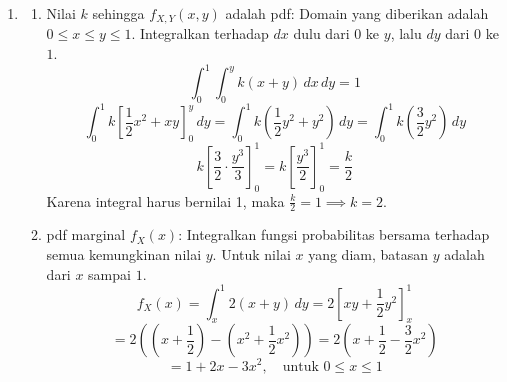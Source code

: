 \documentclass[12pt,a4paper]{article}
\begin{document}
\begin{enumerate}
\begin{enumerate}[label=(\alph*)]
          \item $P[X < Y < 2X]$:
                Batasan integrasi ditentukan oleh $y > x$ dan $y < 2x$ pada kotak $0 < x < 1$ dan $0 < y < 1$.
                Perpotongan garis $y = 2x$ dengan batas $y = 1$ berada di $x = 1/2$. Sehingga daerah ini dibagi dua:
                Untuk nilai elemen $x \in (0, 1/2]$, batas $y$ dari $x$ ke $2x$.
                Untuk nilai elemen $x \in (1/2, 1)$, batas $y$ dari $x$ ke $1$.
                \[ P = \int_{0}^{1/2} \int_{x}^{2x} \frac{2}{3}(x+1) \,dy \,dx + \int_{1/2}^{1} \int_{x}^{1} \frac{2}{3}(x+1) \,dy \,dx \]
                Bagian 1:
                \[ \int_{0}^{1/2} \frac{2}{3}(x+1) (2x - x) \,dx = \int_{0}^{1/2} \frac{2}{3}(x^2 + x) \,dx = \frac{2}{3} \left[ \frac{x^3}{3} + \frac{x^2}{2} \right]_0^{1/2} \]
                \[ = \frac{2}{3} \left( \frac{1/8}{3} + \frac{1/4}{2} \right) = \frac{2}{3} \left( \frac{1}{24} + \frac{1}{8} \right) = \frac{2}{3} \left( \frac{4}{24} \right) = \frac{1}{9} \]
                Bagian 2:
                \[ \int_{1/2}^{1} \frac{2}{3}(x+1) (1 - x) \,dx = \int_{1/2}^{1} \frac{2}{3}(1 - x^2) \,dx = \frac{2}{3} \left[ x - \frac{x^3}{3} \right]_{1/2}^{1} \]
                \[ = \frac{2}{3} \left( \left(1 - \frac{1}{3}\right) - \left(\frac{1}{2} - \frac{1}{24}\right) \right) = \frac{2}{3} \left( \frac{2}{3} - \frac{11}{24} \right) = \frac{2}{3} \left( \frac{5}{24} \right) = \frac{5}{36} \]
                Total probabilitas:
                \[ \frac{1}{9} + \frac{5}{36} = \frac{4}{36} + \frac{5}{36} = \frac{9}{36} = \frac{1}{4} \]
        \end{enumerate}

  \item
        \begin{enumerate}[label=(\alph*)]
          \item Nilai $k$ sehingga $f_{X,Y}(x,y)$ adalah pdf:
                Domain yang diberikan adalah $0 \le x \le y \le 1$. Integralkan terhadap $dx$ dulu dari $0$ ke $y$, lalu $dy$ dari $0$ ke $1$.
                \[ \int_{0}^{1} \int_{0}^{y} k(x+y) \,dx \,dy = 1 \]
                \[ \int_{0}^{1} k \left[ \frac{1}{2}x^2 + xy \right]_0^y \,dy = \int_{0}^{1} k \left( \frac{1}{2}y^2 + y^2 \right) \,dy = \int_{0}^{1} k \left( \frac{3}{2}y^2 \right) \,dy \]
                \[ k \left[ \frac{3}{2} \cdot \frac{y^3}{3} \right]_0^1 = k \left[ \frac{y^3}{2} \right]_0^1 = \frac{k}{2} \]
                Karena integral harus bernilai 1, maka $\frac{k}{2} = 1 \implies k = 2$.

          \item pdf marginal $f_X(x)$:
                Integralkan fungsi probabilitas bersama terhadap semua kemungkinan nilai $y$. Untuk nilai $x$ yang diam, batasan $y$ adalah dari $x$ sampai $1$.
                \[ f_X(x) = \int_{x}^{1} 2(x+y) \,dy = 2 \left[ xy + \frac{1}{2}y^2 \right]_x^1 \]
                \[ = 2 \left( \left(x + \frac{1}{2}\right) - \left(x^2 + \frac{1}{2}x^2\right) \right) = 2 \left( x + \frac{1}{2} - \frac{3}{2}x^2 \right) \]
                \[ = 1 + 2x - 3x^2, \quad \text{untuk } 0 \le x \le 1 \]


\end{enumerate}
\end{enumerate}
\end{document}
